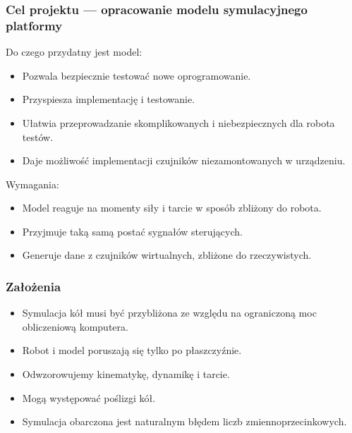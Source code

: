 \documentclass{beamer}
\begin{document}
	\begin{frame}
		\frametitle{Cel projektu --- opracowanie modelu symulacyjnego platformy}
		Do czego przydatny jest model:
		\begin{itemize}
			\item Pozwala bezpiecznie testować nowe oprogramowanie.
			\item Przyspiesza implementację i testowanie.
			\item Ułatwia przeprowadzanie skomplikowanych i niebezpiecznych dla robota testów.
			\item Daje możliwość implementacji czujników niezamontowanych w urządzeniu.
		\end{itemize}
		Wymagania:
		\begin{itemize}
			\item Model reaguje na momenty siły i tarcie w sposób zbliżony do robota.
			\item Przyjmuje taką samą postać sygnałów sterujących.
			\item Generuje dane z czujników wirtualnych, zbliżone do rzeczywistych.
		\end{itemize}
	\end{frame}
	\begin{frame}
		\frametitle{Założenia}
		\begin{itemize}
			\item Symulacja kół musi być przybliżona ze względu na ograniczoną moc obliczeniową komputera.
			\item Robot i model poruszają się tylko po płaszczyźnie.
			\item Odwzorowujemy kinematykę, dynamikę i tarcie.
			\item Mogą występować poślizgi kół.
			\item Symulacja obarczona jest naturalnym błędem liczb zmiennoprzecinkowych.
		\end{itemize}
	\end{frame}
\end{document}
